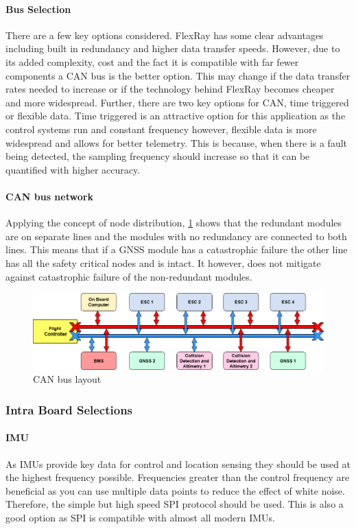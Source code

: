 \paragraph{Bus Selection}
There are a few key options considered. FlexRay has some clear advantages including built in redundancy and higher data transfer speeds. However, due to its added complexity, cost and the fact it is compatible with far fewer components a \gls{CAN} bus is the better option. This may change if the data transfer rates needed to increase or if the technology behind FlexRay becomes cheaper and more widespread. Further, there are two key options for \gls{CAN}, time triggered or flexible data. Time triggered is an attractive option for this application as the control systems run and constant frequency however, flexible data is more widespread and allows for better telemetry. This is because, when there is a fault being detected, the sampling frequency should increase so that it can be quantified with higher accuracy.
\paragraph{CAN bus network}
Applying the concept of node distribution, \ref{fig:CAN_bus} shows that the redundant modules are on separate lines and the modules with no redundancy are connected to both lines. This means that if a \gls{GNSS} module has a catastrophic failure the other line has all the safety critical nodes and is intact. It however, does not mitigate against catastrophic failure of the non-redundant modules.
 \begin{figure}[h!]
 \centering
  \includegraphics[width=1\textwidth]{figs/Thomas/Intra Communication/CAN bus.png}
 \caption{CAN bus layout}
 \label{fig:CAN_bus}
 \end{figure}

\subsubsection{Intra Board Selections}
\paragraph{\gls{IMU}}
As \gls{IMU}s provide key data for control and location sensing they should be used at the highest frequency possible. Frequencies greater than the control frequency are beneficial as you can use multiple data points to reduce the effect of white noise. Therefore, the simple but high speed \gls{SPI} protocol should be used. This is also a good option as \gls{SPI} is compatible with almost all modern \gls{IMU}s.
